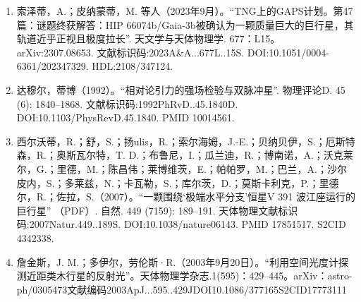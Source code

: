 \begin{enumerate}
\item 索泽蒂，A.；皮纳蒙蒂，M. 等人（2023年9月）。“TNG上的GAPS计划。第47篇：谜题终获解答：HIP 66074b/Gaia-3b被确认为一颗质量巨大的巨行星，其轨道近乎正视且极度拉长”. 天文学与天体物理学. 677：L15。arXiv:2307.08653. 文献标识码:2023A&A...677L..15S. DOI:10.1051/0004-6361/202347329. HDL:2108/347124.
\item 达穆尔，蒂博（1992）。“相对论引力的强场检验与双脉冲星”. 物理评论D. 45 (6): 1840–1868. 文献标识码:1992PhRvD..45.1840D. DOI:10.1103/PhysRevD.45.1840. PMID 10014561.
\item 西尔沃蒂，R.；舒，S.；扬ulis，R.；索尔海姆，J.-E.；贝纳贝伊，S.；厄斯特森，R.；奥斯瓦尔特，T. D.；布鲁尼，I.；瓜兰迪，R.；博南诺，A.；沃克莱尔，G.；里德，M.；陈昌伟；莱博维茨，E.；帕帕罗，M.；巴兰，A.；沙尔皮内，S.；多莱兹，N.；卡瓦勒，S.；库尔茨，D.；莫斯卡利克，P.；里德尔，R.；佐拉，S.（2007）。“一颗围绕‘极端水平分支’恒星V 391 波江座运行的巨行星” （PDF）. 自然. 449 (7159): 189–191. 天体物理文献标识码:2007Natur.449..189S. DOI:10.1038/nature06143. PMID 17851517. S2CID 4342338.
\item 詹金斯，J. M.；多伊尔，劳伦斯·R.（2003年9月20日）。“利用空间光度计探测近距类木行星的反射光”。天体物理学杂志.1(595)：429–445。arXiv：astro-ph/0305473文献编码2003ApJ...595..429JDOI10.1086/377165S2CID17773111
 \end{enumerate}